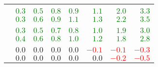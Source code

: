 \begin{center}
\begin{tabular}{lrrrrrrr}
    & \multicolumn{7}{c}{\sla{}} \\ \cmidrule(lr){2-8}
    \uslpropGsecTwin{}          & \textcolor{Green}{$0.3$} & \textcolor{Green}{$0.5$} & \textcolor{Green}{$0.8$} & \textcolor{Green}{$0.9$} & \textcolor{Green}{$1.1$} & \textcolor{Green}{$2.0$} & \textcolor{Green}{$3.3$} \\
    \usruleTwin{}               & \textcolor{Green}{$0.3$} & \textcolor{Green}{$0.6$} & \textcolor{Green}{$0.9$} & \textcolor{Green}{$1.1$} & \textcolor{Green}{$1.3$} & \textcolor{Green}{$2.2$} & \textcolor{Green}{$3.5$} \\
    & \multicolumn{7}{c}{\epi{}} \\ \cmidrule(lr){2-8}
    \uslpropGsecTwin{}          & \textcolor{Green}{$0.3$} & \textcolor{Green}{$0.5$} & \textcolor{Green}{$0.7$} & \textcolor{Green}{$0.8$} & \textcolor{Green}{$1.0$} & \textcolor{Green}{$1.9$} & \textcolor{Green}{$3.0$} \\
    \usruleTwin{}               & \textcolor{Green}{$0.4$} & \textcolor{Green}{$0.6$} & \textcolor{Green}{$0.8$} & \textcolor{Green}{$1.0$} & \textcolor{Green}{$1.2$} & \textcolor{Green}{$1.8$} & \textcolor{Green}{$2.8$} \\
    & \multicolumn{7}{c}{\kiw{}} \\ \cmidrule(lr){2-8}
    \uslpropGsecTwin{}          & $0.0$                    & $0.0$                    & $0.0$                    & $0.0$                    & \textcolor{Red}{$-0.1$}  & \textcolor{Red}{$-0.1$}  & \textcolor{Red}{$-0.3$}  \\
    \usruleTwin{}               & $0.0$                    & $0.0$                    & $0.0$                    & $0.0$                    & $0.0$                    & \textcolor{Red}{$-0.2$}  & \textcolor{Red}{$-0.5$}  \\
    \bottomrule
  \end{tabular}
\end{center}
